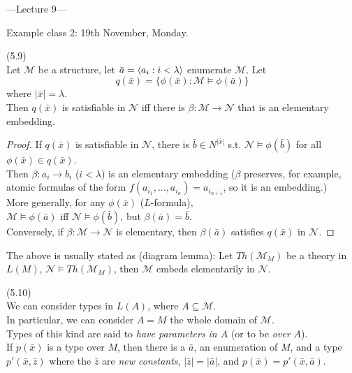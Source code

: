 \documentclass[a4paper]{article}
\begin{document}
---Lecture 9---

Example class 2: 19th November, Monday.

\begin{lemma} (5.9)\\
    Let $\mathcal{M}$ be a structure, let $\bar{a} = \langle a_i:i<\lambda \rangle$ enumerate $\mathcal{M}$. Let
    $$q(\bar{x}) = \{\phi(\bar{x}): \mathcal{M} \vDash \phi(\bar{a})\}$$
    where $|\bar{x}| = \lambda$.\\
    Then $q(\bar{x})$ is satisfiable in $\mathcal{N}$ iff there is $\beta:\mathcal{M} \to \mathcal{N}$ that is an elementary embedding.
    \begin{proof}
        If $q(\bar{x})$ is satisfiable in $\mathcal{N}$, there is $\bar{b} \in N^{|\bar{x}|}$ s.t. $\mathcal{N} \vDash \phi(\bar{b})$ for all $\phi(\bar{x}) \in q(\bar{x})$.\\
        Then $\beta:a_i \to b_i$ ($i < \lambda$) is an elementary embedding ($\beta$ preserves, for example, atomic formulas of the form $f(a_{i_1},...,a_{i_n}) = a_{i_{n+1}}$, so it is an embedding.)\\
        More generally, for any $\phi(\bar{x})$ ($L$-formula),\\
        $\mathcal{M} \vDash \phi(\bar{a})$ iff $\mathcal{N} \vDash \phi(\bar{b})$, but $\beta(\bar{a}) = \bar{b}$.\\
        Conversely, if $\beta:\mathcal{M} \to \mathcal{N}$ is elementary, then $\beta(\bar{a})$ satisfies $q(\bar{x})$ in $\mathcal{N}$.
    \end{proof}
\end{lemma}

\begin{rem}
    The above is usually stated as (diagram lemma): Let $Th(\mathcal{M}_M)$ be a theory in $L(M)$, $\mathcal{N} \vDash Th(\mathcal{M}_M)$, then $\mathcal{M}$ embeds elementarily in $\mathcal{N}$.
\end{rem}

\begin{rem} (5.10)\\
    We can consider types in $L(A)$, where $A \subseteq \mathcal{M}$.\\
    In particular, we can consider $A=M$ the whole domain of $\mathcal{M}$.\\
    Types of this kind are said to \emph{have parameters in $A$} (or to be \emph{over $A$}).\\
    If $p(\bar{x})$ is a type over $M$, then there is a $\bar{a}$, an enumeration of $M$, and a type $p'(\bar{x},\bar{z})$ where the $\bar{z}$ are \emph{new constants}, $|\bar{z}| = |\bar{a}|$, and $p(\bar{x}) = p'(\bar{x},\bar{a})$.
\end{rem}
\end{document}
